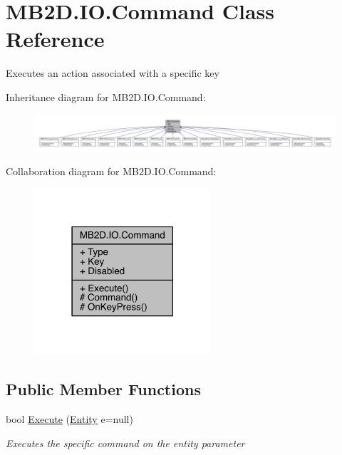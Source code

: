 \hypertarget{class_m_b2_d_1_1_i_o_1_1_command}{}\section{M\+B2\+D.\+I\+O.\+Command Class Reference}
\label{class_m_b2_d_1_1_i_o_1_1_command}


Executes an action associated with a specific key  




Inheritance diagram for M\+B2\+D.\+I\+O.\+Command\+:
\nopagebreak
\begin{figure}[H]
\begin{center}
\leavevmode
\includegraphics[width=350pt]{class_m_b2_d_1_1_i_o_1_1_command__inherit__graph}
\end{center}
\end{figure}


Collaboration diagram for M\+B2\+D.\+I\+O.\+Command\+:
\nopagebreak
\begin{figure}[H]
\begin{center}
\leavevmode
\includegraphics[width=186pt]{class_m_b2_d_1_1_i_o_1_1_command__coll__graph}
\end{center}
\end{figure}
\subsection*{Public Member Functions}
\begin{DoxyCompactItemize}
\item 
bool \hyperlink{class_m_b2_d_1_1_i_o_1_1_command_a59f97dd5810dd5b112c82ad3758da7e8}{Execute} (\hyperlink{class_m_b2_d_1_1_entity_component_1_1_entity}{Entity} e=null)
\begin{DoxyCompactList}\small\item\em Executes the specific command on the entity parameter \end{DoxyCompactList}\end{DoxyCompactItemize}
